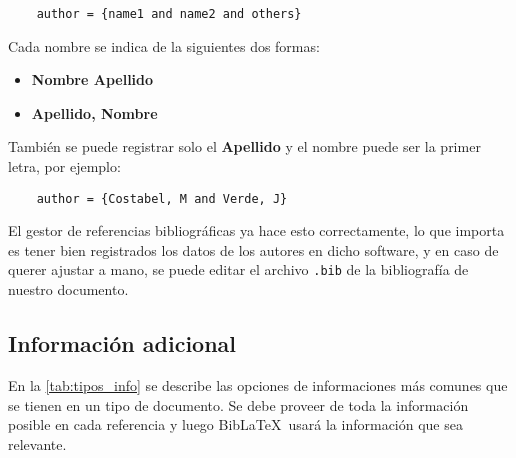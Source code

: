 \begin{lstlisting}
	author = {name1 and name2 and others}
\end{lstlisting}

Cada nombre se indica de la siguientes dos formas:
\begin{itemize}
	\item \textbf{Nombre Apellido}
	\item \textbf{Apellido, Nombre}
\end{itemize}

También se puede registrar solo el \textbf{Apellido} y el nombre puede ser la primer letra, por ejemplo:

\begin{lstlisting}
	author = {Costabel, M and Verde, J}
\end{lstlisting}

El gestor de referencias bibliográficas ya hace esto correctamente, lo que importa es tener bien registrados los datos de los autores en dicho software, y en caso de querer ajustar a mano, se puede editar el archivo \verb|.bib| de la bibliografía de nuestro documento.

\subsection{Información adicional}
En la \autoref{tab:tipos_info} se describe las opciones de informaciones más comunes que se tienen en un tipo de documento. Se debe proveer de toda la información posible en cada referencia y luego Bib\LaTeX\ usará la información que sea relevante.

